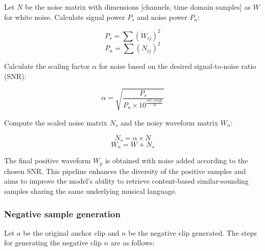 Let $N$ be the noise matrix with dimensions [channels, time domain samples] as $W$ for white noise. Calculate signal power $P_s$ and noise power $P_n$:

\begin{equation}
P_s = \sum (W_{ij})^2
\end{equation}
\begin{equation}
P_n = \sum (N_{ij})^2
\end{equation}

Calculate the scaling factor $\alpha$ for noise based on the desired signal-to-noise ratio (SNR):

\begin{equation}
\alpha = \sqrt{\frac{P_s}{P_n \times 10^{\frac{snr\_range}{10}}}}
\end{equation}

Compute the scaled noise matrix $N_s$ and the noisy waveform matrix $W_n$:

\begin{equation}
N_s = \alpha \times N
\end{equation}
\begin{equation}
W_n = W + N_s
\end{equation}

The final positive waveform $W_p$ is obtained with noise added according to the chosen SNR. This pipeline enhances the diversity of the positive samples and aims to improve the model's ability to retrieve content-based similar-sounding samples sharing the same underlying musical language.

\subsubsection{Negative sample generation}

Let $a$ be the original anchor clip and $n$ be the negative clip generated. The steps for generating the negative clip $n$ are as follows:

